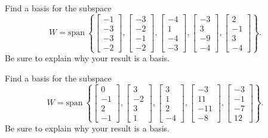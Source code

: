 \documentclass{article}
\begin{document}
\begin{exerciseStatement}
    Find a basis for the subspace
\[W=\mathrm{span}\ \left\{\left[\begin{array}{r}
-1 \\
-3 \\
-3 \\
-2
\end{array}\right] , \left[\begin{array}{r}
-3 \\
-2 \\
-1 \\
-2
\end{array}\right] , \left[\begin{array}{r}
-4 \\
1 \\
-4 \\
-3
\end{array}\right] , \left[\begin{array}{r}
-3 \\
3 \\
-9 \\
-4
\end{array}\right] , \left[\begin{array}{r}
2 \\
-1 \\
3 \\
-4
\end{array}\right]\right\}.\]
 Be sure to explain why your result is a basis.


  
\end{exerciseStatement}

\begin{exerciseStatement}
    Find a basis for the subspace
\[W=\mathrm{span}\ \left\{\left[\begin{array}{r}
0 \\
-1 \\
2 \\
-1
\end{array}\right] , \left[\begin{array}{r}
3 \\
-2 \\
3 \\
1
\end{array}\right] , \left[\begin{array}{r}
3 \\
1 \\
2 \\
-4
\end{array}\right] , \left[\begin{array}{r}
-3 \\
11 \\
-11 \\
-8
\end{array}\right] , \left[\begin{array}{r}
-3 \\
-1 \\
-7 \\
12
\end{array}\right]\right\}.\]
 Be sure to explain why your result is a basis.


  
\end{exerciseStatement}
\end{document}
